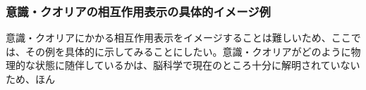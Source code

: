 \subsubsection{意識・クオリアの相互作用表示の具体的イメージ例}
意識・クオリアにかかる相互作用表示をイメージすることは難しいため、ここでは、その例を具体的に示してみることにしたい。意識・クオリアがどのように物理的な状態に随伴しているかは、脳科学で現在のところ十分に解明されていないため、ほん